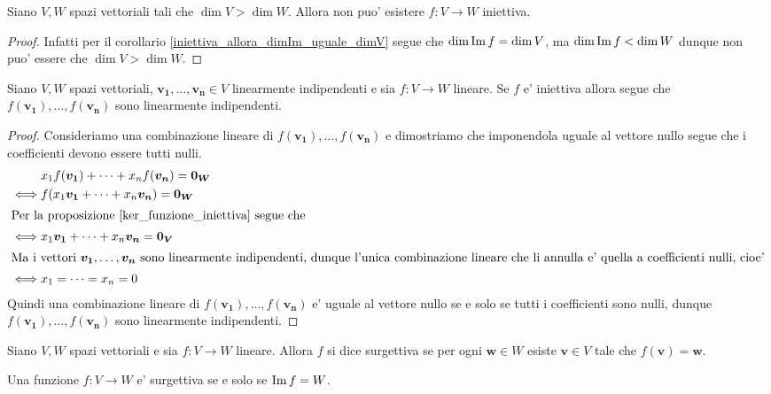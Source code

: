 \begin{corollary}
    Siano $V, W$ spazi vettoriali tali che $\dim V > \dim W$. Allora non puo' esistere $f : V \to W$ iniettiva.
\end{corollary}
\begin{proof}
    Infatti per il corollario \ref{iniettiva_allora_dimIm_uguale_dimV} segue che $\dim \operatorname{Im}f = \dim V$, ma $\dim \operatorname{Im}f < \dim W$ dunque non puo' essere che $\dim V > \dim W$.
\end{proof}

\begin{proposition}\label{indipendenti_mappati_indipendenti}
    Siano $V, W$ spazi vettoriali, $\bm{v_1}, \dots, \bm{v_n} \in V$ linearmente indipendenti e sia $f : V \to W$ lineare. Se $f$ e' iniettiva allora segue che $f(\bm{v_1}), \dots, f(\bm{v_n})$ sono linearmente indipendenti. 
\end{proposition}
\begin{proof}
    Consideriamo una combinazione lineare di $f(\bm{v_1}), \dots, f(\bm{v_n})$ e dimostriamo che imponendola uguale al vettore nullo segue che i coefficienti devono essere tutti nulli.
    \begin{alignat*}
        {1}
        &x_1f(\bm{v_1}) + \dots + x_nf(\bm{v_n}) = \bm{0_W}\\
        \iff &f(x_1\bm{v_1} + \dots + x_n\bm{v_n}) = \bm{0_W}\\
        \intertext{Per la proposizione \ref{ker_funzione_iniettiva} segue che}
        \iff &x_1\bm{v_1} + \dots + x_n\bm{v_n} = \bm{0_V}\\
        \intertext{Ma i vettori $\bm{v_1}, \dots, \bm{v_n}$ sono linearmente indipendenti, dunque l'unica combinazione lineare che li annulla e' quella a coefficienti nulli, cioe'}
        \iff &x_1 = \dots = x_n = 0
    \end{alignat*}
    Quindi una combinazione lineare di $f(\bm{v_1}), \dots, f(\bm{v_n})$ e' uguale al vettore nullo se e solo se tutti i coefficienti sono nulli, dunque $f(\bm{v_1}), \dots, f(\bm{v_n})$ sono linearmente indipendenti.
\end{proof}

\begin{definition}
    Siano $V, W$ spazi vettoriali e sia $f : V \to W$ lineare. Allora $f$ si dice surgettiva se per ogni $\bm{w} \in W$ esiste $\bm{v} \in V$ tale che $f(\bm{v}) = \bm{w}$.
\end{definition}

\begin{remark}
    Una funzione $f : V \to W$ e' surgettiva se e solo se $\operatorname{Im}f = W$.
\end{remark}


